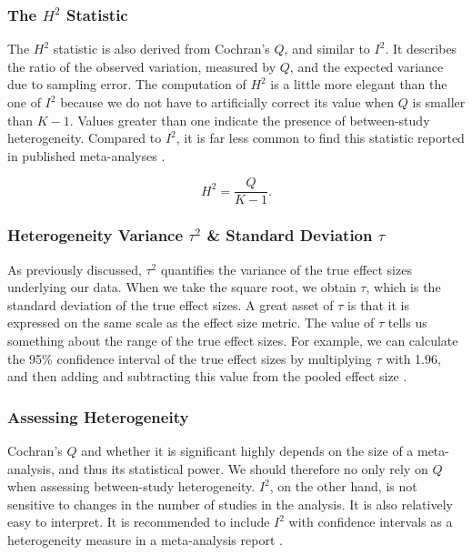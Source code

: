 \documentclass[../../../main.tex]{subfiles}
\begin{document}
\subsubsection{The $H^2$ Statistic}

The $H^2$ statistic is also derived from Cochran's $Q$, and similar to $I^2$. It describes the ratio of the observed variation, measured by $Q$, and the expected variance due to sampling error. The computation of $H^2$ is a little more elegant than the one of $I^2$ because we do not have to artificially correct its value when $Q$ is smaller than $K-1$. Values greater than one indicate the presence of between-study heterogeneity. Compared to $I^2$, it is far less common to find this statistic reported in published meta-analyses \autocite{Harrer2021}.

\begin{equation}
H^2 = \frac{Q}{K-1}.
\end{equation}

\subsubsection{Heterogeneity Variance $\tau^2$ \& Standard Deviation $\tau$}

As previously discussed, $\tau^2$ quantifies the variance of the true effect sizes underlying our data. When we take the square root, we obtain $\tau$, which is the standard deviation of the true effect sizes. A great asset of $\tau$ is that it is expressed on the same scale as the effect size metric. The value of $\tau$ tells us something about the range of the true effect sizes. For example, we can calculate the 95\% confidence interval of the true effect sizes by multiplying $\tau$ with 1.96, and then adding and subtracting this value from the pooled effect size \autocite{Harrer2021}.

\subsubsection{Assessing Heterogeneity}

Cochran's $Q$ and whether it is significant highly depends on the size of a meta-analysis, and thus its statistical power. We should therefore no only rely on $Q$ when assessing between-study heterogeneity. $I^2$, on the other hand, is not sensitive to changes in the number of studies in the analysis. It is also relatively easy to interpret. It is recommended to include $I^2$ with confidence intervals as a heterogeneity measure in a meta-analysis report \autocite{Harrer2021}.
\end{document}
